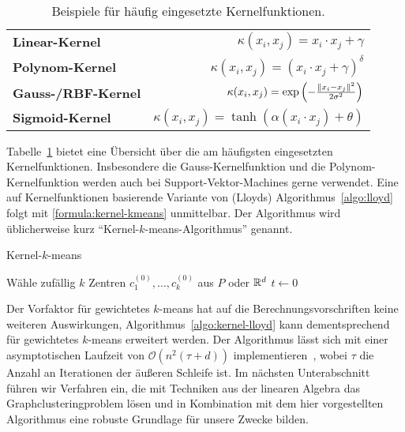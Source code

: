 \begin{table}[t]
\centering
\begin{tabular}{@{}lr@{}} \toprule
	\textbf{Linear-Kernel} & $\kappa(x_i, x_j) = x_i \cdot x_j + \gamma $ \\
	\textbf{Polynom-Kernel} & $\kappa(x_i, x_j) = \left( x_i \cdot x_j + \gamma \right)^\delta$ \\
	\textbf{Gauss-/RBF-Kernel} & $\kappa(x_i, x_j) = \exp \left( - \frac{\lVert {x_i} - {x_j} \rVert^2}{2 \sigma^2} \right)$ \\
	\textbf{Sigmoid-Kernel} & $\kappa(x_i, x_j) = \tanh(\alpha(x_i \cdot x_j) + \theta) $ \\ \bottomrule
\end{tabular}
\caption{Beispiele für häufig eingesetzte Kernelfunktionen.}
\label{tbl:kernel-functions}
\end{table}
Tabelle~\ref{tbl:kernel-functions} bietet eine Übersicht über die am häufigsten eingesetzten Kernelfunktionen. Insbesondere
die Gauss-Kernelfunktion und die Polynom-Kernelfunktion werden auch bei Support-Vektor-Machines gerne verwendet.
\absatz
Eine auf Kernelfunktionen basierende Variante von (Lloyds) Algorithmus~\ref{algo:lloyd} folgt mit \ref{formula:kernel-kmeans}
unmittelbar. Der Algorithmus wird üblicherweise kurz "`Kernel-$k$-means-Algorithmus"' genannt.

\begin{algorithm}[H]
\label{algo:kernel-lloyd}
\caption{Kernel-$k$-means}
	\DontPrintSemicolon
	
	\BlankLine
	
	Wähle zufällig $k$ Zentren $c_1^{(0)}, \dots, c_k^{(0)}$ aus $P$ oder $\mathbb{R}^{d}$\;
	$t \leftarrow 0$\;
\end{algorithm}
Der Vorfaktor für gewichtetes $k$-means hat auf die Berechnungsvorschriften keine weiteren Auswirkungen,
Algorithmus~\ref{algo:kernel-lloyd} kann dementsprechend für gewichtetes $k$-means erweitert werden. Der Algorithmus
lässt sich mit einer asymptotischen Laufzeit von $\mathcal{O}(n^2 (\tau + d))$ implementieren~\cite{DhillonGK04,DhillonGK07},
wobei $\tau$ die Anzahl an Iterationen der äußeren Schleife ist.
\absatz
Im nächsten Unterabschnitt führen wir Verfahren ein, die mit Techniken aus der linearen Algebra das Graphclusteringproblem
lösen und in Kombination mit dem hier vorgestellten Algorithmus eine robuste Grundlage für unsere Zwecke bilden.

